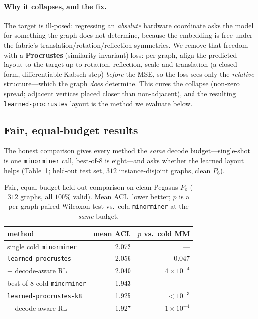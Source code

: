 \documentclass[acmsmall,anonymous,nonacm]{acmart}
\begin{document}
\paragraph{Why it collapses, and the fix.}
\label{sec:learn-fix}
The target is ill-posed: regressing an \emph{absolute} hardware coordinate asks the
model for something the graph does not determine, because the embedding is free under
the fabric's translation/rotation/reflection symmetries. We remove that freedom with a
\textbf{Procrustes} (similarity-invariant) loss: per graph, align the predicted layout
to the target up to rotation, reflection, scale and translation (a closed-form,
differentiable Kabsch step) \emph{before} the MSE, so the loss sees only the
\emph{relative} structure---which the graph \emph{does} determine. This cures the
collapse (non-zero spread; adjacent vertices placed closer than non-adjacent), and the
resulting \texttt{learned-procrustes} layout is the method we evaluate below.

\subsection{Fair, equal-budget results}
\label{sec:learn-results}

The honest comparison gives every method the \emph{same} decode budget---single-shot
is one \texttt{minorminer} call, best-of-$8$ is eight---and asks whether the learned
layout helps (Table~\ref{tab:learn-quality}; held-out test set, $312$ instance-disjoint
graphs, clean $P_6$).

\begin{table}[t]
\caption{Fair, equal-budget held-out comparison on clean Pegasus $P_6$ ($312$ graphs,
all $100\%$ valid). Mean ACL, lower better; $p$ is a per-graph paired Wilcoxon test
vs.\ cold \texttt{minorminer} at the \emph{same} budget.}
\label{tab:learn-quality}
\small
\begin{tabular}{lrr}
\toprule
method & mean ACL & $p$ vs.\ cold MM\\
\midrule
single cold \texttt{minorminer}        & 2.072 & ---\\
\texttt{learned-procrustes}            & 2.056 & $0.047$\\
\quad + decode-aware RL                & 2.040 & $4{\times}10^{-4}$\\
\midrule
best-of-$8$ cold \texttt{minorminer}   & 1.943 & ---\\
\texttt{learned-procrustes-k8}         & 1.925 & ${<}10^{-3}$\\
\quad + decode-aware RL                & 1.927 & $1{\times}10^{-4}$\\
\bottomrule
\end{tabular}
\end{table}
\end{document}
